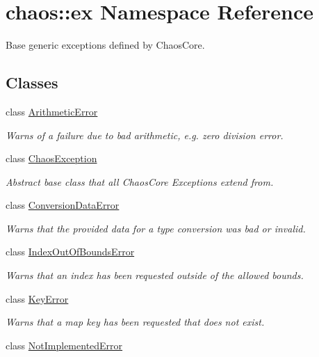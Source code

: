 \hypertarget{namespacechaos_1_1ex}{}\section{chaos\+:\+:ex Namespace Reference}
\label{namespacechaos_1_1ex}


Base generic exceptions defined by Chaos\+Core.  


\subsection*{Classes}
\begin{DoxyCompactItemize}
\item 
class \hyperlink{classchaos_1_1ex_1_1_arithmetic_error}{Arithmetic\+Error}
\begin{DoxyCompactList}\small\item\em Warns of a failure due to bad arithmetic, e.\+g. zero division error. \end{DoxyCompactList}\item 
class \hyperlink{classchaos_1_1ex_1_1_chaos_exception}{Chaos\+Exception}
\begin{DoxyCompactList}\small\item\em Abstract base class that all Chaos\+Core Exceptions extend from. \end{DoxyCompactList}\item 
class \hyperlink{classchaos_1_1ex_1_1_conversion_data_error}{Conversion\+Data\+Error}
\begin{DoxyCompactList}\small\item\em Warns that the provided data for a type conversion was bad or invalid. \end{DoxyCompactList}\item 
class \hyperlink{classchaos_1_1ex_1_1_index_out_of_bounds_error}{Index\+Out\+Of\+Bounds\+Error}
\begin{DoxyCompactList}\small\item\em Warns that an index has been requested outside of the allowed bounds. \end{DoxyCompactList}\item 
class \hyperlink{classchaos_1_1ex_1_1_key_error}{Key\+Error}
\begin{DoxyCompactList}\small\item\em Warns that a map key has been requested that does not exist. \end{DoxyCompactList}\item 
class \hyperlink{classchaos_1_1ex_1_1_not_implemented_error}{Not\+Implemented\+Error}

\end{DoxyCompactItemize}
